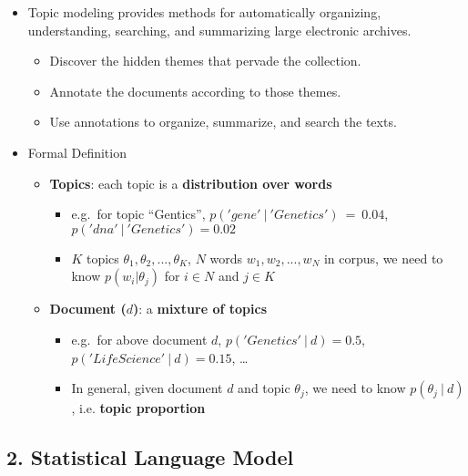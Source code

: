 \documentclass[11pt]{article}
\providecommand{\tightlist}{%
      \setlength{\itemsep}{0pt}\setlength{\parskip}{0pt}}
\begin{document}
\begin{itemize}
\tightlist
\item
  Topic modeling provides methods for automatically organizing,
  understanding, searching, and summarizing large electronic archives.

  \begin{itemize}
  \tightlist
  \item
    Discover the hidden themes that pervade the collection.
  \item
    Annotate the documents according to those themes.
  \item
    Use annotations to organize, summarize, and search the texts.
  \end{itemize}
\item
  Formal Definition

  \begin{itemize}
  \tightlist
  \item
    \textbf{Topics}: each topic is a \textbf{distribution over words}

    \begin{itemize}
    \tightlist
    \item
      e.g.~for topic ``Gentics'', \(p('gene'~|~'Genetics')~=~0.04\),
      \(p('dna'~|~'Genetics')=0.02\)
    \item
      \(K\) topics \(\theta_1, \theta_2, ..., \theta_K\), \(N\) words
      \(w_1, w_2, ..., w_N\) in corpus, we need to know
      \(p(w_i|\theta_j)\) for \(i \in N\) and \(j\in K\)
    \end{itemize}
  \item
    \textbf{Document (\(d\))}: a \textbf{mixture of topics}

    \begin{itemize}
    \tightlist
    \item
      e.g.~for above document \(d\), \(p('Genetics'~|~d)=0.5\),
      \(p('LifeScience'~|~d)=0.15\), \ldots{}
    \item
      In general, given document \(d\) and topic \(\theta_j\), we need
      to know \(p(\theta_j~|~d)\), i.e. \textbf{topic proportion}
    \end{itemize}
  \end{itemize}
\end{itemize}

    \hypertarget{statistical-language-model}{%
\subsection{2. Statistical Language
Model}\label{statistical-language-model}}
\end{document}
